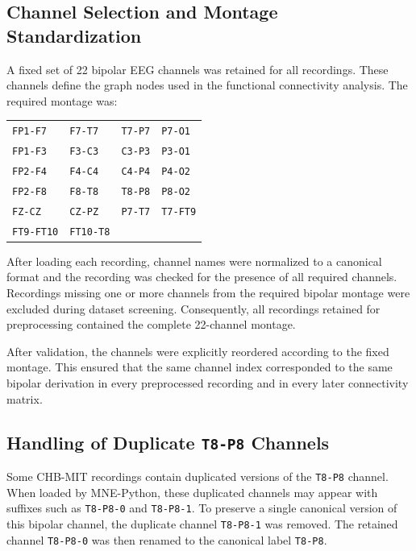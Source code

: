 \subsection{Channel Selection and Montage Standardization}
\label{subsec:channel-selection-montage-standardization}

A fixed set of \num{22} bipolar EEG channels was retained for all recordings.
These channels define the graph nodes used in the functional connectivity
analysis. The required montage was:

\begin{center}
\begin{tabular}{llll}
\toprule
\texttt{FP1-F7} & \texttt{F7-T7} & \texttt{T7-P7} & \texttt{P7-O1} \\
\texttt{FP1-F3} & \texttt{F3-C3} & \texttt{C3-P3} & \texttt{P3-O1} \\
\texttt{FP2-F4} & \texttt{F4-C4} & \texttt{C4-P4} & \texttt{P4-O2} \\
\texttt{FP2-F8} & \texttt{F8-T8} & \texttt{T8-P8} & \texttt{P8-O2} \\
\texttt{FZ-CZ} & \texttt{CZ-PZ} & \texttt{P7-T7} & \texttt{T7-FT9} \\
\texttt{FT9-FT10} & \texttt{FT10-T8} & & \\
\bottomrule
\end{tabular}
\end{center}

After loading each recording, channel names were normalized to a canonical
format and the recording was checked for the presence of all required channels.
Recordings missing one or more channels from the required bipolar montage were
excluded during dataset screening. Consequently, all recordings retained for
preprocessing contained the complete \num{22}-channel montage.

After validation, the channels were explicitly reordered according to the fixed
montage. This ensured that the same channel index corresponded to the same
bipolar derivation in every preprocessed recording and in every later
connectivity matrix.

\subsection{Handling of Duplicate \texorpdfstring{\texttt{T8-P8}}{T8-P8} Channels}
\label{subsec:t8-p8-duplicate-handling}

Some CHB-MIT recordings contain duplicated versions of the \texttt{T8-P8}
channel. When loaded by MNE-Python, these duplicated channels may appear with
suffixes such as \texttt{T8-P8-0} and \texttt{T8-P8-1}. To preserve a single
canonical version of this bipolar channel, the duplicate channel
\texttt{T8-P8-1} was removed. The retained channel \texttt{T8-P8-0} was then
renamed to the canonical label \texttt{T8-P8}.

